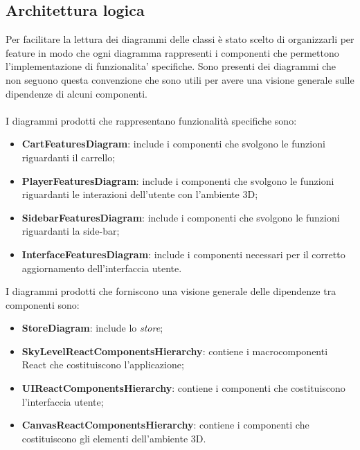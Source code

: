 \subsection{Architettura logica}
Per facilitare la lettura dei diagrammi delle classi è stato scelto di organizzarli per feature in modo che ogni diagramma 
rappresenti i componenti che permettono l'implementazione di funzionalita' specifiche.
Sono presenti dei diagrammi che non seguono questa convenzione che sono utili per avere una visione generale sulle dipendenze
di alcuni componenti.
\\\\
I diagrammi prodotti che rappresentano funzionalità specifiche sono:
\begin{itemize}
	\item \textbf{CartFeaturesDiagram}: include i componenti che svolgono le funzioni riguardanti il carrello;
	\item \textbf{PlayerFeaturesDiagram}: include i componenti che svolgono le funzioni riguardanti le interazioni dell'utente con 
	l'ambiente 3D;
	\item \textbf{SidebarFeaturesDiagram}: include i componenti che svolgono le funzioni riguardanti la side-bar;
	\item \textbf{InterfaceFeaturesDiagram}: include i componenti necessari per il corretto aggiornamento dell'interfaccia utente.
\end{itemize}
I diagrammi prodotti che forniscono una visione generale delle dipendenze tra componenti sono:
\begin{itemize}
	\item \textbf{StoreDiagram}: include lo \textit{store};
	\item \textbf{SkyLevelReactComponentsHierarchy}: contiene i macrocomponenti React che costituiscono l'applicazione;
	\item \textbf{UIReactComponentsHierarchy}: contiene i componenti che costituiscono l'interfaccia utente;
	\item \textbf{CanvasReactComponentsHierarchy}: contiene i componenti che costituiscono gli elementi dell'ambiente 3D.
\end{itemize}
